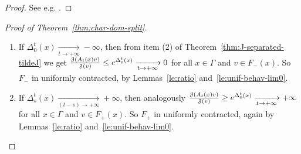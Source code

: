 \documentclass[12pt,reqno]{amsart}
\numberwithin{equation}{section}
\theoremstyle{plain}
\theoremstyle{definition}
\newcommand{\J}{\EuScript{J}}
\begin{document}
\begin{proof}
  See e.g. \cite{Man82}.
\end{proof}


\begin{proof}[Proof of Theorem~\ref{thm:char-dom-split}]
  \begin{enumerate}
  \item If
    $\Delta_0^t(x)\xrightarrow[t\to+\infty]{}-\infty$, then
    from item (2) of Theorem~\ref{thm:J-separated-tildeJ} we
    get $ \frac{\J(A_t(x)v)}{\J(v)}\le
    e^{\Delta_0^t(x)}\xrightarrow[t\to+\infty]{}0 $ for all
    $x\in\Gamma$ and $v\in F_-(x)$. So $F_-$ in uniformly
    contracted, by Lemmas~\ref{le:ratio}
    and~\ref{le:unif-behav-lim0}.
  \item 
    If $\Delta_s^t(x)\xrightarrow[(t-s)\to+\infty]{}
    +\infty$, then analogously $
    \frac{\J(A_t(x)v)}{\J(v)}\ge
    e^{\Delta_0^t(x)}\xrightarrow[t\to+\infty]{}+\infty $
    for all $x\in\Gamma$ and $v\in F_+(x)$. So $F_+$ in
    uniformly contracted, again by Lemmas~\ref{le:ratio}
    and~\ref{le:unif-behav-lim0}.
  \end{enumerate}






\end{proof}
\end{document}
